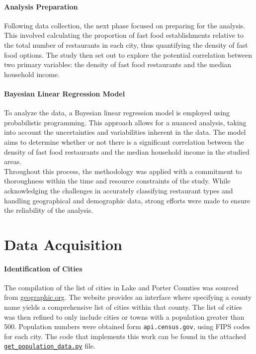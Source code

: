 \documentclass[12pt]{article}
\begin{document}
\paragraph{Analysis Preparation}
Following data collection, the next phase focused on preparing for the analysis. This involved calculating the proportion of fast food establishments relative to the total number of restaurants in each city, thus quantifying the density of fast food options. The study then set out to explore the potential correlation between two primary variables: the density of fast food restaurants and the median household income.

\paragraph{Bayesian Linear Regression Model}
To analyze the data, a Bayesian linear regression model is employed using probabilistic programming. This approach allows for a nuanced analysis, taking into account the uncertainties and variabilities inherent in the data. The model aims to determine whether or not there is a significant correlation between the density of fast food restaurants and the median household income in the studied areas. \\

\noindent Throughout this process, the methodology was applied with a commitment to thoroughness within the time and resource constraints of the study. While acknowledging the challenges in accurately classifying restaurant types and handling geographical and demographic data, strong efforts were made to ensure the reliability of the analysis.

\section*{Data Acquisition}

\paragraph{Identification of Cities}
The compilation of the list of cities in Lake and Porter Counties was sourced from \href{https://geographic.org/streetview/usa/in/lake/index.html}{geographic.org}. The website provides an interface where specifying a county name yields a comprehensive list of cities within that county. The list of cities was then refined to only include cities or towns with a population greater than 500. Population numbers were obtained form \texttt{api.census.gov}, using FIPS codes for each city. The code that implements this work can be found in the attached \href{https://github.com/cucupac/bayesian-stats/blob/main/project/data_collection/get_population_data.py}{\texttt{get\_population\_data.py}} file.
\end{document}
